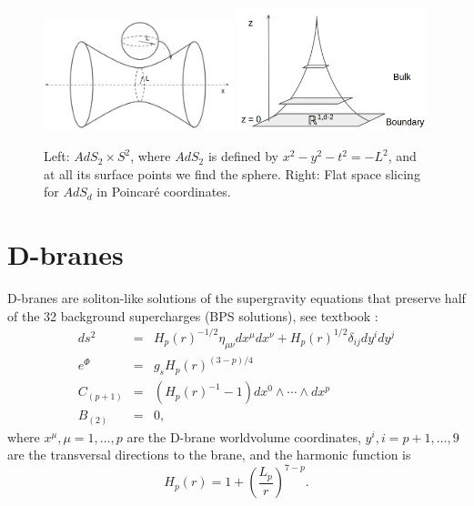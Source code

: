 \begin{figure}[t]
\begin{center}
\includegraphics[width=0.49\textwidth]{Images/AdS2xS2.png}
\includegraphics[width=0.49\textwidth]{Images/AdSPoincare.png}
\end{center}
\caption{\label{fig:AdS} Left: $AdS_2\times S^2$, where $AdS_2$ is defined by $x^2-y^2-t^2 = - L^2$, 
and at all its surface points we find the sphere.
Right: Flat space slicing for $AdS_d$ in Poincar\'e coordinates.}
\end{figure}

\section{D-branes}

D-branes are soliton-like solutions of the supergravity equations 
that preserve half of the 32 background supercharges (BPS solutions), see textbook \cite{Ammon:2015wua}:
\begin{eqnarray}
 ds^2   &=& H_p(r)^{-1/2} \eta_{\mu\nu}dx^\mu dx^\nu +  H_p(r)^{1/2} \delta_{ij} dy^i dy^j\\
 e^\Phi &=& g_s H_p(r)^{(3-p)/4}\\
 C_{(p+1)}&=&(H_p(r)^{-1} - 1) dx^0\wedge\cdots\wedge dx^p\\
 B_{(2)} &=& 0,
\end{eqnarray}
where $x^\mu, \mu=1,\ldots, p$ are the D-brane worldvolume coordinates, 
$y^i, i=p+1,\ldots,9$ are the transversal directions to the brane,
and the harmonic function is
\begin{equation}
 H_p(r) = 1 + \left( \dfrac{L_p}{r}\right)^{7-p}.
\end{equation}

